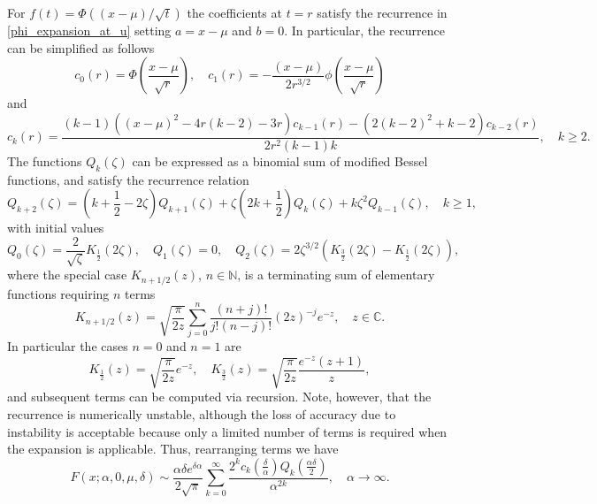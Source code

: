 \documentclass[10pt,a4paper,oneside]{article}
\numberwithin{equation}{section}
\begin{document}
For $f(t) = \Phi((x-\mu)/\sqrt{t})$ the coefficients at $t=r$ satisfy the recurrence in \eqref{phi_expansion_at_u} setting $a=x-\mu$ and $b=0$. In particular, the recurrence can be simplified as follows
\begin{equation}
c_0(r) = \Phi\left(\frac{x-\mu}{\sqrt{r}}\right), \quad c_1(r) = -\frac{(x-\mu)}{2 r^{3/2}} \phi\left(\frac{x-\mu}{\sqrt{r}}\right)
\end{equation}
and
\begin{equation}
c_k(r) = \frac{(k - 1) ((x-\mu)^2 - 4 r(k-2) - 3r) c_{k-1}(r) - (2(k-2)^2 + k-2) c_{k-2}(r)}{2r^2 (k-1) k}, \quad k\ge 2.
\end{equation}
The functions $Q_k(\zeta)$ can be expressed as a binomial sum of modified Bessel functions, and satisfy the recurrence relation \cite[\S 27.3.28]{Temme2015}
\begin{equation}
Q_{k+2}(\zeta) = \left(k + \frac{1}{2} -2\zeta\right) Q_{k+1}(\zeta) + \zeta\left(2k + \frac{1}{2}\right)Q_k(\zeta) + k\zeta^2 Q_{k-1}(\zeta), \quad k\ge 1,
\end{equation}
with initial values
\begin{equation}
Q_0(\zeta) = \frac{2}{\sqrt{\zeta}} K_{\frac{1}{2}}(2 \zeta), \quad Q_1(\zeta) = 0, \quad Q_2(\zeta) = 2 \zeta^{3/2} \left(K_{\frac{3}{2}}(2\zeta) - K_{\frac{1}{2}}(2 \zeta)\right),
\end{equation}
where the special case $K_{n+1/2}(z)$, $n \in \mathbb{N}$, is a terminating sum of elementary functions requiring $n$ terms
\begin{equation}\label{besselk_half}
K_{n + 1/2}(z) = \sqrt{\frac{\pi}{2z}} \sum_{j=0}^n \frac{(n + j)!}{j! (n-j)!} (2z)^{-j}e^{-z}, \quad z\in \mathbb{C}.
\end{equation}
In particular the cases $n=0$ and $n=1$ are
\begin{equation*}
K_{\frac{1}{2}}(z) = \sqrt{\frac{\pi}{2z}}e^{-z}, \quad K_{\frac{3}{2}}(z) = \sqrt{\frac{\pi}{2 z}}\frac{e^{-z} (z+1)}{z},
\end{equation*}
and subsequent terms can be computed via recursion. Note, however, that the recurrence is numerically unstable, although the loss of accuracy due to instability is acceptable because only a limited number of terms is required when the expansion is applicable.
Thus, rearranging terms we have
\begin{equation}\label{uniform_expansion_a_large}
F(x; \alpha, 0, \mu, \delta) \sim \frac{\alpha \delta e^{\delta \alpha}}{2 \sqrt{\pi}} \sum_{k=0}^{\infty} \frac{2^k c_k\left(\frac{\delta}{\alpha}\right) Q_k\left(\frac{\alpha \delta}{2}\right)}{\alpha^{2k}}, \quad \alpha \to \infty.
\end{equation}
\end{document}
